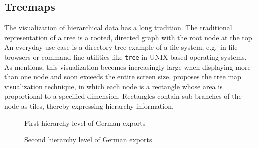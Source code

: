 \documentclass{article}
\begin{document}
\subsection{Treemaps}
The visualization of hierarchical data has a long tradition.
The traditional representation of a tree is a rooted, directed graph with the root node at the top.
An everyday use case is a directory tree example of a file system, e.g.\ in file browsers or command line utilities like \texttt{tree} in UNIX based operating systems.
As \textcite{Shneiderman1992} mentions, this visualization becomes increasingly large when displaying more than one node and soon exceeds the entire screen size.
\textcite{Johnson1991} proposes the tree map visualization technique, in which each node is a rectangle whose area is proportional to a specified dimension.
Rectangles contain sub-branches of the node as tiles, thereby expressing hierarchy information.
\begin{figure}[h]
    \centering
    \caption{First hierarchy level of German exports}\label{fig:theory:treemap-german-exports-1}
\end{figure}

\begin{figure}[h]
    \centering
    \caption{Second hierarchy level of German exports}\label{fig:theory:treemap-german-exports-2}
\end{figure}
\end{document}
